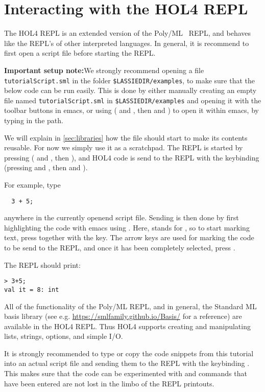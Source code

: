 \section{Interacting with the HOL4 REPL}

The HOL4 REPL is an extended version of the Poly/ML~\cite{polymlweb} REPL, and
behaves like the REPL's of other interpreted languages.
In general, it is recommend to first open a script file before starting
the REPL.

\textbf{Important setup note:}We strongly recommend opening a file
\texttt{tutorialScript.sml} in the folder \texttt{\$LASSIEDIR/examples}, to make
sure that the below code can be run easily.
This is done by either manually creating an empty file named \texttt{tutorialScript.sml} in \texttt{\$LASSIEDIR/examples}
and opening it with the toolbar buttons in emacs, or using  ( and , then  and )
to open it within emacs, by typing in the path.

We will explain in \autoref{sec:libraries} how the file should start to make its
contents reusable. For now we simply use it as a scratchpad.
The REPL is started by pressing  ( and , then ),
and HOL4 code is send to the REPL with the keybinding 
(pressing  and , then  and ).

For example, type
\begin{lstlisting}
  3 + 5;
\end{lstlisting}

anywhere in the currently openend script file.
Sending is then done by first highlighting the code with emacs using .
Here,  stands for , so to start marking text, press
 together with the  key.
The arrow keys are used for marking the code to be send to the REPL, and once it
has been completely selected, press .

The REPL should print:
\begin{lstlisting}[frame=single]
> 3+5;
val it = 8: int
\end{lstlisting}

All of the functionality of the Poly/ML REPL, and in general, the Standard ML
basis library (see e.g. \url{https://smlfamily.github.io/Basis/} for a reference)
are available in the HOL4 REPL.
Thus HOL4 supports creating and manipulating lists, strings, options, and
simple I/O.

It is strongly recommended to type or copy the code snippets from this tutorial
into an actual script file and sending them to the REPL with the keybinding .
This makes sure that the code can be experimented with and commands that have
been entered are not lost in the limbo of the REPL printouts.

